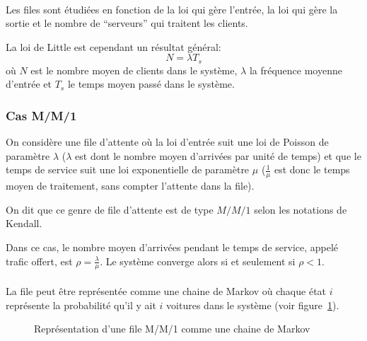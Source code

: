   \paragraph{}
  Les files sont étudiées en fonction de la loi qui gère l'entrée, la loi qui
  gère la sortie et le nombre de ``serveurs'' qui traitent les clients.

  La loi de Little est cependant un résultat général:
    \[N = \lambda T_s\]
  où $N$ est le nombre moyen de clients dans le système, $\lambda$ la fréquence
  moyenne d'entrée et $T_s$ le temps moyen passé dans le système.

  \subsubsection{Cas M/M/1}
    On considère une file d'attente où la loi d'entrée suit une loi de Poisson
    de paramètre $\lambda$ ($\lambda$ est dont le nombre moyen d'arrivées par
    unité de temps) et que le temps de service suit une loi exponentielle de
    paramètre $\mu$ ($\frac 1 \mu$ est donc le temps moyen de traitement, sans
    compter l'attente dans la file).

    On dit que ce genre de file d'attente est de type $M/M/1$ selon les
    notations de Kendall.

    Dans ce cas, le nombre moyen d'arrivées pendant le temps de service, appelé
    trafic offert, est $\rho = \frac \lambda \mu$. Le système converge alors si
    et seulement si $\rho < 1$.
    
    \paragraph{}
    La file peut être représentée comme une chaine de Markov où chaque état $i$
    représente la probabilité qu'il y ait $i$ voitures dans le système (voir
    figure~\ref{fig:markov1}).

    \begin{figure}[h]
      \centering
      \caption{Représentation d'une file M/M/1 comme une chaine de Markov
        \cite{procstochs_cc}}
      \label{fig:markov1}
    \end{figure}

